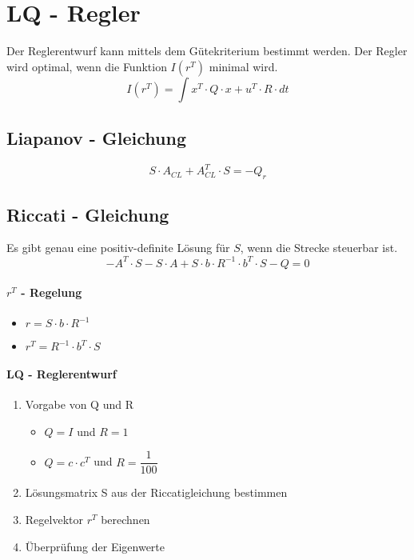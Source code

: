 



\section{LQ - Regler}
Der Reglerentwurf kann mittels dem Gütekriterium bestimmt werden. Der Regler wird optimal, wenn die Funktion $ I(r^T) $ minimal wird.
\[
I(r^T)=\int {x^T\cdot Q\cdot x+u^T\cdot R \cdot dt}
\]
\subsection{Liapanov - Gleichung}
\[
S\cdot A_{CL} + A^T_{CL}\cdot S = -Q_r
\]
\subsection{Riccati - Gleichung}
Es gibt genau eine positiv-definite Lösung für $ S $, wenn die Strecke steuerbar ist.
\[
-A^T\cdot S-S\cdot A+S\cdot b\cdot R^{-1} \cdot b^T \cdot S-Q=0	
\]
\paragraph{$ r^T $ - Regelung}	
	\begin{itemize}
		\item $ r=S\cdot b\cdot R^{-1} $
		\item $ r^T=R^{-1}\cdot b^T\cdot S $
	\end{itemize}

\paragraph{LQ - Reglerentwurf}
	\begin{enumerate}
		\item Vorgabe von Q und R
		\begin{itemize}
			\item $ Q=I $ und $ R=1 $
			\item $ Q=c\cdot c^T $ und $ R= \dfrac{1}{100} $
		\end{itemize}
		\item Lösungsmatrix S aus der Riccatigleichung bestimmen
		\item Regelvektor $ r^T $ berechnen
		\item Überprüfung der Eigenwerte
	\end{enumerate}

